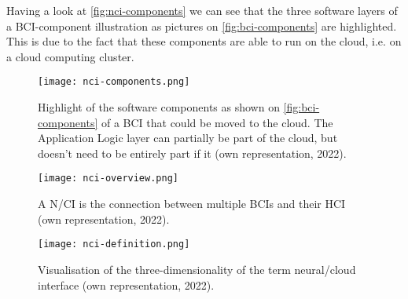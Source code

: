Having a look at \autoref{fig:nci-components} we can see that the three software layers of a BCI-component illustration as pictures on \autoref{fig:bci-components} are highlighted. This is due to the fact that these components are able to run on the cloud, i.e. on a cloud computing cluster.

\begin{figure}[!ht]
  \centering
  \texttt{[image: nci-components.png]}
  \caption{Highlight of the software components as shown on \autoref{fig:bci-components} of a BCI that could be moved to the cloud. The Application Logic layer can partially be part of the cloud, but doesn't need to be entirely part if it (own representation, 2022).}
  \label{fig:nci-components}
\end{figure}


\begin{figure}[!ht]
  \centering
  \texttt{[image: nci-overview.png]}
  \caption{A N/CI is the connection between multiple BCIs and their HCI (own representation, 2022).}
  \label{fig:nci-overview}
\end{figure}

\begin{figure}[!ht]
  \centering
  \texttt{[image: nci-definition.png]}
  \caption{Visualisation of the three-dimensionality of the term neural/cloud interface (own representation, 2022).}
  \label{fig:nci-definition}
\end{figure}




